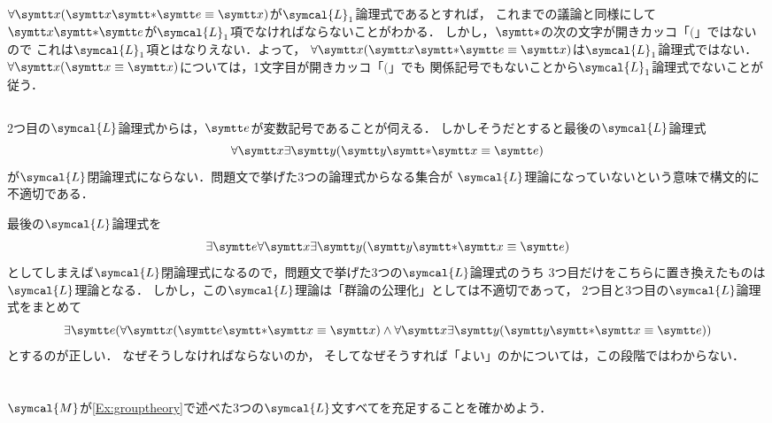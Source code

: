 \(\apply{\forall \obj{x}}{\obj{x} \obj{\ast} \obj{e} \objeq \obj{x}}\)が\(\symcal{L}_1\)論理式であるとすれば，
これまでの議論と同様にして\(\obj{x} \obj{\ast} \obj{e}\)が\(\symcal{L}_1\)項でなければならないことがわかる．
しかし，\(\obj{\ast}\)の次の文字が開きカッコ「\(\lparen\)」ではないので
これは\(\symcal{L}_1\)項とはなりえない．よって，
\(\apply{\forall \obj{x}}{\obj{x} \obj{\ast} \obj{e} \objeq \obj{x}}\)は\(\symcal{L}_1\)論理式ではない．
\(\apply{\forall \obj{x}}{\obj{x} \objeq \obj{x}}\)については，1文字目が開きカッコ「\(\lparen\)」でも
関係記号でもないことから\(\symcal{L}_1\)論理式でないことが従う．

\subsection*{}

2つ目の\(\symcal{L}\)論理式からは，\(\obj{e}\)が変数記号であることが伺える．
しかしそうだとすると最後の\(\symcal{L}\)論理式
\[
	\forall \obj{x} \exists \obj{y} \paren{\obj{y} \obj{\ast} \obj{x} \objeq \obj{e}}
\]
が\(\symcal{L}\)閉論理式にならない．問題文で挙げた3つの論理式からなる集合が
\(\symcal{L}\)理論になっていないという意味で構文的に不適切である．

最後の\(\symcal{L}\)論理式を
\[
	\exists \obj{e} \forall \obj{x} \exists \obj{y} \paren{\obj{y} \obj{\ast} \obj{x} \objeq \obj{e}}
\]
としてしまえば\(\symcal{L}\)閉論理式になるので，問題文で挙げた3つの\(\symcal{L}\)論理式のうち
3つ目だけをこちらに置き換えたものは\(\symcal{L}\)理論となる．
しかし，この\(\symcal{L}\)理論は「群論の公理化」としては不適切であって，
2つ目と3つ目の\(\symcal{L}\)論理式をまとめて
\[
	\exists \obj{e} \paren{
		\forall \obj{x} \paren{\obj{e} \obj{\ast} \obj{x} \objeq \obj{x}}
		\land \forall \obj{x} \exists \obj{y} \paren{\obj{y} \obj{\ast} \obj{x} \objeq \obj{e}}
	}
\]
とするのが正しい．
なぜそうしなければならないのか，
そしてなぜそうすれば「よい」のかについては，この段階ではわからない．

\section*{}

\subsection*{}

\(\symcal{M}\)が\cref{Ex:grouptheory}で述べた3つの\(\symcal{L}\)文すべてを充足することを確かめよう．

